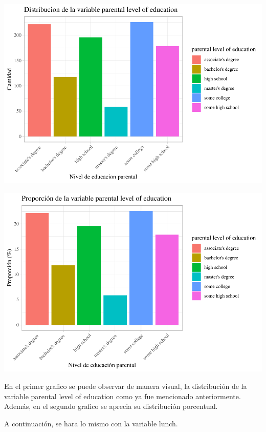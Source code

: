 \documentclass[
]{article}
\begin{document}
\begin{center}\includegraphics{Trabajo-Grupo-6.-Students-performance_files/figure-latex/unnamed-chunk-5-1} \end{center}

\begin{center}\includegraphics{Trabajo-Grupo-6.-Students-performance_files/figure-latex/unnamed-chunk-5-2} \end{center}

En el primer grafico se puede observar de manera visual, la distribución
de la variable parental level of education como ya fue mencionado
anteriormente. Además, en el segundo grafico se aprecia su distribución
porcentual.

A continuación, se hara lo mismo con la variable lunch.
\end{document}
